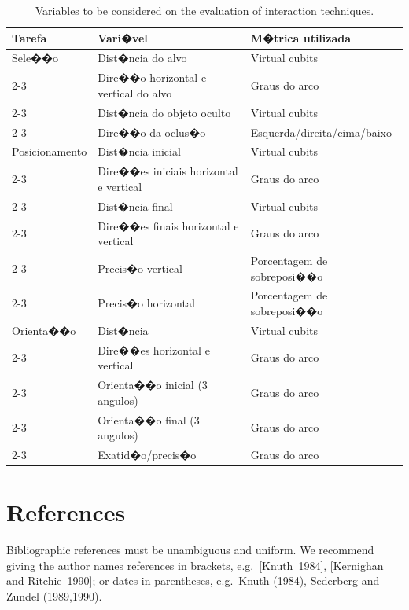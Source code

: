 \documentclass{SBCbookchapter}
\begin{document}
\begin{table}[h!]
	\caption{Variables to be considered on the evaluation of
		interaction techniques.}
	\label{tabone}
	\begin{footnotesize}
	\begin{tabular}{|p{40mm}|p{55mm}|p{42mm}|}
	\hline
	\hspace*{\fill}\textbf{Tarefa}\hspace*{\fill} &
	\hspace*{\fill}\textbf{Vari�vel}\hspace*{\fill} & 
	\hspace*{\fill}\textbf{M�trica utilizada}\hspace*{\fill}\\
	\hline
	Sele��o &
	Dist�ncia do alvo &
	Virtual cubits \\ \cline{2-3}
	& Dire��o horizontal e vertical do alvo &
	Graus do arco \\ \cline{2-3}
	& Dist�ncia do objeto oculto &
	Virtual cubits \\ \cline{2-3}
	& Dire��o da oclus�o &
	Esquerda/direita/cima/baixo \\
	\hline
	Posicionamento &
	Dist�ncia inicial &
	Virtual cubits \\ \cline{2-3}
	& Dire��es iniciais horizontal e vertical &
	Graus do arco \\ \cline{2-3}
	& Dist�ncia final &
	Virtual cubits \\ \cline{2-3}
	& Dire��es finais horizontal e vertical &
	Graus do arco \\ \cline{2-3}
	& Precis�o vertical &
	Porcentagem de sobreposi��o \\ \cline{2-3}
	& Precis�o horizontal &
	Porcentagem de sobreposi��o \\
	\hline
	Orienta��o &
	Dist�ncia &
	Virtual cubits \\ \cline{2-3}
	& Dire��es horizontal e vertical &
	Graus do arco \\ \cline{2-3}
	& Orienta��o inicial (3 angulos) &
	Graus do arco \\ \cline{2-3}
	& Orienta��o final (3 angulos) &
	Graus do arco \\ \cline{2-3}
	& Exatid�o/precis�o &
	Graus do arco \\
	\hline
	\end{tabular}
	\end{footnotesize}
\end{table}

\section{References}
Bibliographic references must be unambiguous and uniform.  We
recommend giving the author names references in brackets,
e.g.~[Knuth~1984], [Kernighan and Ritchie~1990]; or dates in
parentheses, e.g.~Knuth (1984), Sederberg and Zundel (1989,1990).
\end{document}
